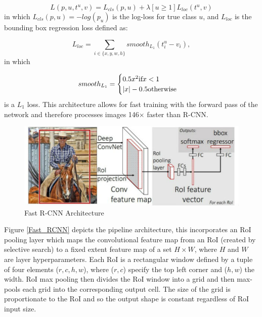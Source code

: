 \documentclass[a4paper,11pt,notitlepage]{article}
\begin{document}
\begin{equation}
\label{multi-task_loss}
L(p,u,t^{u},v) = L_{cls}(p,u) + \lambda[u \geq 1]L_{loc}(t^{u},v)
\end{equation}
in which $L_{cls}(p,u) = -log(p_{u})$ is the log-loss for true class $u$, and $L_{loc}$ is the bounding box regression loss defined as:

\begin{equation}
\label{bbox_loss}
L_{loc} = \sum_{i\in \{x,y,w,h\}}smooth_{L_{1}}(t^{u}_{i}-v_{i}),
\end{equation}
in which

\begin{equation}
\label{multi-task_s}
smooth_{L_{1}} = 
\begin{cases}
0.5x^{2} \textnormal{if} x < 1 \\
|x| - 0.5  \textnormal{otherwise} \\
\end{cases}
\end{equation}
is a $L_{1}$ loss. This architecture allows for fast training with the forward pass of the network and therefore processes images 146$\times$ faster than R-CNN. 

\noindent \begin{figure}[h!]
\includegraphics[width = 1.0\hsize]{./figures/fast-rcnn2.jpg}
\caption{Fast R-CNN Architecture \cite{DBLP:journals/corr/Girshick15}}
\label{Fast_RNN}
\end{figure}

Figure \ref{Fast_RCNN} depicts the pipeline architecture, this incorporates an RoI pooling layer which maps the convolutional feature map from an RoI (created by selective search) to a fixed extent feature map of a set $H \times W$, where $H$ and $W$ are layer hyperparameters. Each RoI is a rectangular window defined by a tuple of four elements ($r,c,h,w$), where ($r,c$) specify the top left corner and ($h,w$) the width. RoI max pooling then divides the RoI window into a grid and then max-pools each grid into the corresponding output cell. The size of the grid is proportionate to the RoI and so the output shape is constant regardless of RoI input size. 
\end{document}
